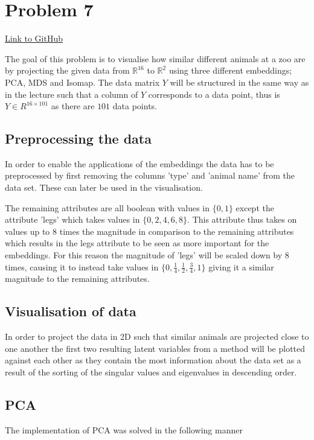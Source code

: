 \section*{Problem 7}

\href{https://github.com/Filipbergentoft/DD2434/tree/main/Assignment%201}{Link to GitHub}

The goal of this problem is to visualise how similar different animals at a zoo are by projecting the given data from $\mathbb{R}^{16}$ to $\mathbb{R}^{2}$ using three different embeddings; PCA, MDS and Isomap. The data matrix $Y$ will be structured in the same way as in the lecture such that a column of $Y$ corresponds to a data point, thus is $Y \in R^{16 \times 101}$ as there are $101$ data points.

\subsection*{Preprocessing the data}
In order to enable the applications of the embeddings the data has to be preprocessed by first removing the columns 'type' and 'animal name' from the data set. These can later be used in the visualisation.

The remaining attributes are all boolean with values in $\{ 0,1 \}$ except the attribute 'legs' which takes values in $\{ 0, 2, 4, 6, 8 \}$. This attribute thus takes on values up to $8$ times the magnitude in comparison to the remaining attributes which results in the legs attribute to be seen as more important for the embeddings. For this reason the magnitude of 'legs' will be scaled down by $8$ times, causing it to instead take values in  $\{ 0, \frac{1}{4}, \frac{1}{2}, \frac{3}{4}, 1 \}$ giving it a similar magnitude to the remaining attributes.

\subsection*{Visualisation of data}
In order to project the data in 2D such that similar animals are projected close to one another the first two resulting latent variables from a method will be plotted against each other as they contain the most information about the data set as a result of the sorting of the singular values and eigenvalues in descending order.


\subsection*{PCA}
The implementation of PCA was solved in the following manner

